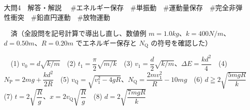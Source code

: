 \documentclass[paper=b5, fontsize=8pt, fleqn, twoside]{jlreq}
\begin{document}
\begin{ascolorbox4A}[75点・30分]{大問4　解答・解説}
　\#エネルギー保存　\#単振動　\#運動量保存　\#完全非弾性衝突　\#鉛直円運動　\#放物運動\par
{}　済（全設問を記号計算で導出し直し、数値例 $m=1.0\unit{kg}$、$k=400\unit{N/m}$、$d=0.50\unit{m}$、$R=0.20\unit{m}$ でエネルギー保存と $N_\mathrm{Q}$ の符号を確認した）\par
{}　(1) $v_0=d\sqrt{k/m}$　(2) $t_1=\dfrac{\pi}{2}\sqrt{m/k}$　(3) $v_1=\dfrac{d}{2}\sqrt{k/m}$、$\Delta E=\dfrac{kd^2}{4}$　(4) $N_\mathrm{P}=2mg+\dfrac{kd^2}{2R}$　(5) $v_\mathrm{Q}=\sqrt{v_1^2-4gR}$、$N_\mathrm{Q}=\dfrac{2mv_1^2}{R}-10mg$　(6) $d\geqq 2\sqrt{\dfrac{5mgR}{k}}$　(7) $t=2\sqrt{\dfrac{R}{g}}$、$x=2v_\mathrm{Q}\sqrt{\dfrac{R}{g}}$　(8) $d=2\sqrt{\dfrac{7mgR}{k}}$
\end{ascolorbox4A}
\end{document}
